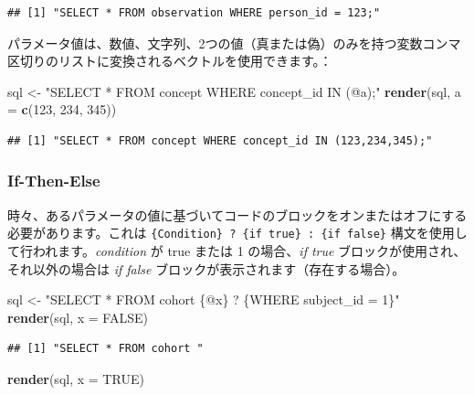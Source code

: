 \documentclass[
  11pt]{book}
\newenvironment{Shaded}{\begin{snugshade}}{\end{snugshade}}
\newcommand{\AttributeTok}[1]{\textcolor[rgb]{0.13,0.29,0.53}{#1}}
\newcommand{\ConstantTok}[1]{\textcolor[rgb]{0.56,0.35,0.01}{#1}}
\newcommand{\DecValTok}[1]{\textcolor[rgb]{0.00,0.00,0.81}{#1}}
\newcommand{\FunctionTok}[1]{\textcolor[rgb]{0.13,0.29,0.53}{\textbf{#1}}}
\newcommand{\NormalTok}[1]{#1}
\newcommand{\OtherTok}[1]{\textcolor[rgb]{0.56,0.35,0.01}{#1}}
\newcommand{\StringTok}[1]{\textcolor[rgb]{0.31,0.60,0.02}{#1}}
\theoremstyle{definition}
\theoremstyle{definition}
\theoremstyle{definition}
\theoremstyle{definition}
\theoremstyle{remark}
\begin{document}
\begin{verbatim}
## [1] "SELECT * FROM observation WHERE person_id = 123;"
\end{verbatim}

パラメータ値は、数値、文字列、2つの値（真または偽）のみを持つ変数コンマ区切りのリストに変換されるベクトルを使用できます。：

\begin{Shaded}
\begin{Highlighting}[]
\NormalTok{sql }\OtherTok{\textless{}{-}} \StringTok{"SELECT * FROM concept WHERE concept\_id IN (@a);"}
\FunctionTok{render}\NormalTok{(sql, }\AttributeTok{a =} \FunctionTok{c}\NormalTok{(}\DecValTok{123}\NormalTok{, }\DecValTok{234}\NormalTok{, }\DecValTok{345}\NormalTok{))}
\end{Highlighting}
\end{Shaded}

\begin{verbatim}
## [1] "SELECT * FROM concept WHERE concept_id IN (123,234,345);"
\end{verbatim}

\subsubsection*{If-Then-Else}\label{if-then-else}

時々、あるパラメータの値に基づいてコードのブロックをオンまたはオフにする必要があります。これは \texttt{\{Condition\}\ ?\ \{if\ true\}\ :\ \{if\ false\}} 構文を使用して行われます。\emph{condition} が true または 1 の場合、\emph{if true} ブロックが使用され、それ以外の場合は \emph{if false} ブロックが表示されます（存在する場合）。

\begin{Shaded}
\begin{Highlighting}[]
\NormalTok{sql }\OtherTok{\textless{}{-}} \StringTok{"SELECT * FROM cohort \{@x\} ? \{WHERE subject\_id = 1\}"}
\FunctionTok{render}\NormalTok{(sql, }\AttributeTok{x =} \ConstantTok{FALSE}\NormalTok{)}
\end{Highlighting}
\end{Shaded}

\begin{verbatim}
## [1] "SELECT * FROM cohort "
\end{verbatim}

\begin{Shaded}
\begin{Highlighting}[]
\FunctionTok{render}\NormalTok{(sql, }\AttributeTok{x =} \ConstantTok{TRUE}\NormalTok{)}
\end{Highlighting}
\end{Shaded}
\end{document}
